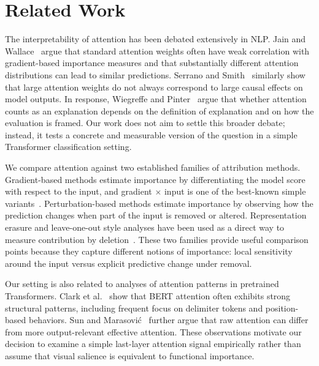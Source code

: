 \section{Related Work}
\label{sec:related_work}

The interpretability of attention has been debated extensively in NLP. Jain and Wallace~\cite{jain2019attention} argue that standard attention weights often have weak correlation with gradient-based importance measures and that substantially different attention distributions can lead to similar predictions. Serrano and Smith~\cite{serrano2019attention} similarly show that large attention weights do not always correspond to large causal effects on model outputs. In response, Wiegreffe and Pinter~\cite{wiegreffe2019attention} argue that whether attention counts as an explanation depends on the definition of explanation and on how the evaluation is framed. Our work does not aim to settle this broader debate; instead, it tests a concrete and measurable version of the question in a simple Transformer classification setting.

We compare attention against two established families of attribution methods. Gradient-based methods estimate importance by differentiating the model score with respect to the input, and gradient $\times$ input is one of the best-known simple variants~\cite{ancona2018towards}. Perturbation-based methods estimate importance by observing how the prediction changes when part of the input is removed or altered. Representation erasure and leave-one-out style analyses have been used as a direct way to measure contribution by deletion~\cite{li2017erasure}. These two families provide useful comparison points because they capture different notions of importance: local sensitivity around the input versus explicit predictive change under removal.

Our setting is also related to analyses of attention patterns in pretrained Transformers. Clark et al.~\cite{clark2019bert} show that BERT attention often exhibits strong structural patterns, including frequent focus on delimiter tokens and position-based behaviors. Sun and Marasovi\'c~\cite{sun2021effective} further argue that raw attention can differ from more output-relevant effective attention. These observations motivate our decision to examine a simple last-layer attention signal empirically rather than assume that visual salience is equivalent to functional importance.
